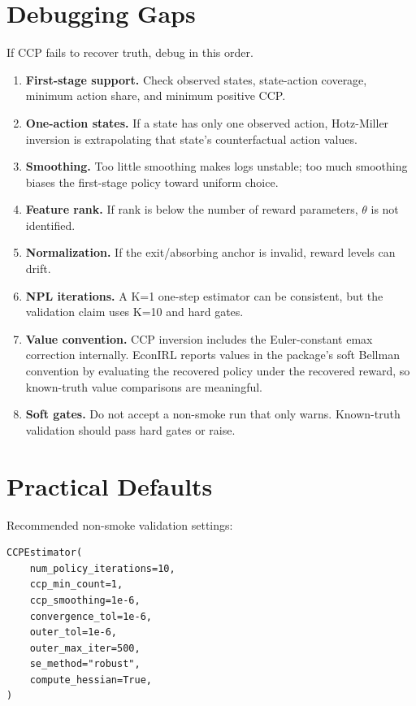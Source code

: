 \documentclass[10pt]{article}
\begin{document}


\section{Debugging Gaps}

If CCP fails to recover truth, debug in this order.

\begin{enumerate}
\item \textbf{First-stage support.} Check observed states, state-action
coverage, minimum action share, and minimum positive CCP.
\item \textbf{One-action states.} If a state has only one observed action,
Hotz-Miller inversion is extrapolating that state's counterfactual action
values.
\item \textbf{Smoothing.} Too little smoothing makes logs unstable; too much
smoothing biases the first-stage policy toward uniform choice.
\item \textbf{Feature rank.} If rank is below the number of reward parameters,
\(\theta\) is not identified.
\item \textbf{Normalization.} If the exit/absorbing anchor is invalid, reward
levels can drift.
\item \textbf{NPL iterations.} A K=1 one-step estimator can be consistent, but
the validation claim uses K=10 and hard gates.
\item \textbf{Value convention.} CCP inversion includes the Euler-constant
emax correction internally. EconIRL reports values in the package's soft
Bellman convention by evaluating the recovered policy under the recovered
reward, so known-truth value comparisons are meaningful.
\item \textbf{Soft gates.} Do not accept a non-smoke run that only warns.
Known-truth validation should pass hard gates or raise.
\end{enumerate}

\section{Practical Defaults}

Recommended non-smoke validation settings:

\begin{lstlisting}
CCPEstimator(
    num_policy_iterations=10,
    ccp_min_count=1,
    ccp_smoothing=1e-6,
    convergence_tol=1e-6,
    outer_tol=1e-6,
    outer_max_iter=500,
    se_method="robust",
    compute_hessian=True,
)
\end{lstlisting}
\end{document}
